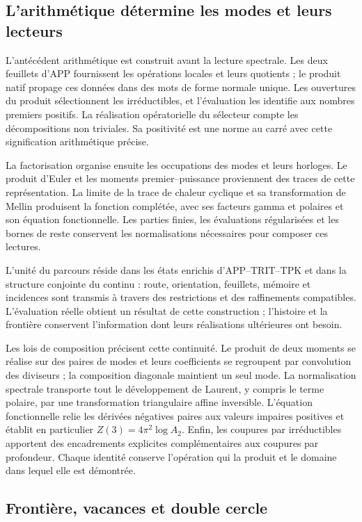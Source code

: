 \subsection*{L'arithmétique détermine les modes et leurs lecteurs}

L'antécédent arithmétique est construit avant la lecture
spectrale. Les deux feuillets d'APP fournissent les opérations
locales et leurs quotients ; le produit natif propage ces données
dans des mots de forme normale unique. Les ouvertures du produit
sélectionnent les irréductibles, et l'évaluation les identifie aux
nombres premiers positifs. La réalisation opératorielle du sélecteur
compte les décompositions non triviales. Sa positivité est
une norme au carré avec cette signification arithmétique précise.

La factorisation organise ensuite les occupations des modes et
leurs horloges. Le produit d’Euler et les moments
premier--puissance proviennent des traces de cette représentation.
La limite de la trace de chaleur cyclique et sa transformation de
Mellin produisent la fonction complétée, avec ses facteurs gamma
et polaires et son équation fonctionnelle. Les parties finies, les
évaluations régularisées et les bornes de reste conservent
les normalisations nécessaires pour composer ces lectures.

L'unité du parcours réside dans les états enrichis d'APP--TRIT--TPK et dans la structure conjointe du continu : route, orientation, feuillets, mémoire et incidences sont transmis à travers des restrictions et des raffinements compatibles. L'évaluation réelle obtient un résultat de cette construction ; l'histoire et la frontière conservent l'information dont leurs réalisations ultérieures ont besoin.

Les lois de composition précisent cette continuité. Le produit de
deux moments se réalise sur des paires de modes et leurs coefficients se
regroupent par convolution des diviseurs ; la composition diagonale maintient
un seul mode. La normalisation spectrale transporte tout le développement
de Laurent, y compris le terme polaire, par une transformation
triangulaire affine inversible. L'équation fonctionnelle relie les
dérivées négatives paires aux valeurs impaires positives et
établit en particulier $Z(3)=4\pi^2\log A_2$. Enfin, les coupures
par irréductibles apportent des encadrements explicites complémentaires aux
coupures par profondeur. Chaque identité conserve l'opération qui la
produit et le domaine dans lequel elle est démontrée.

\subsection*{Frontière, vacances et double cercle}

